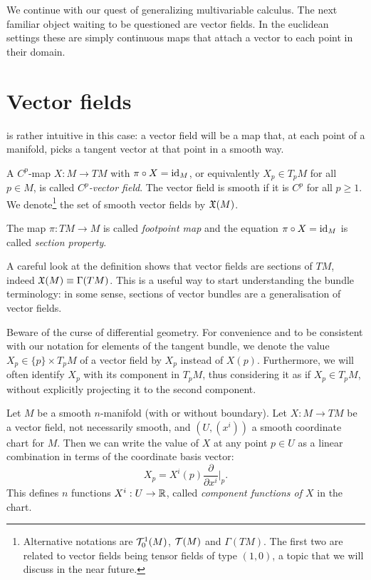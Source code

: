 We continue with our quest of generalizing multivariable calculus.
The next familiar object waiting to be questioned are vector fields.
In the euclidean settings these are simply continuous maps that attach a vector to each point in their domain.

\section{Vector fields}

 is rather intuitive in this case: a vector field will be a map that, at each point of a manifold, picks a tangent vector at that point in a smooth way.

\begin{definition}\label{def:vfield}
  A $C^p$-map $X: M \to TM$ with $\pi\circ X = \operatorname{id}_M$, or equivalently $X_p\in T_pM$ for all $p\in M$, is called \emph{$C^p$-vector field}.
  The vector field is smooth if it is $C^p$ for all $p\geq 1$.
  We denote\footnote{Alternative notations are $\mathcal{T}_0^1(M)$, $\mathcal{T}(M)$ and $\Gamma(TM)$. The first two are related to vector fields being tensor fields of type $(1,0)$, a topic that we will discuss in the near future.} the set of smooth vector fields by $\mathfrak{X}(M)$.

  The map $\pi:TM \to M$ is called \emph{footpoint map} and the equation $\pi\circ X = \operatorname{id}_M$ is called \emph{section property}.
\end{definition}

\begin{remark}
  A careful look at the definition shows that vector fields are sections of $TM$, indeed $\mathfrak{X}(M) \equiv \Gamma(TM)$.
  This is a useful way to start understanding the bundle terminology: in some sense, sections of vector bundles are a generalisation of vector fields.
\end{remark}

Beware of the curse of differential geometry.
For convenience and to be consistent with our notation for elements of the tangent bundle, we denote the value $X_p\in\{p\}\times T_p M$ of a vector field by $X_p$ instead of $X(p)$.
Furthermore, we will often identify $X_p$ with its component in $T_pM$, thus considering it as if $X_p\in T_pM$, without explicitly projecting it to the second component.

Let $M$ be a smooth $n$-manifold (with or without boundary).
Let $X:M\to TM$ be a vector field, not necessarily smooth, and $(U, (x^i))$ a smooth coordinate chart for $M$. Then we can write the value of $X$ at any point $p\in U$ as a linear combination in terms of the coordinate basis vector:
\begin{equation}\label{eq:vfCoordBAsis0}
  X_p = X^i(p) \frac{\partial}{\partial x^i}\Big|_p.
\end{equation}
This defines $n$ functions $X^i: U\to\mathbb{R}$, called \emph{component functions of $X$} in the chart.

